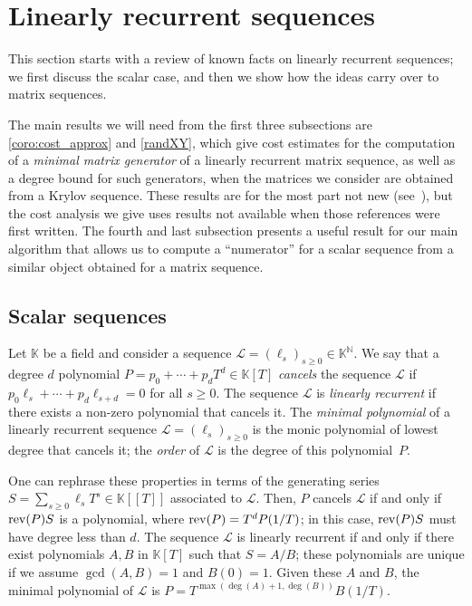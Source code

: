 \documentclass[12pt]{article}
\newcommand{\minpoly}{P}
\def\N {\ensuremath{\mathbb{N}}}
\def\K{\mathbb{K}}
\def\K {\ensuremath{\mathbb{K}}}
\begin{document}

\section{Linearly recurrent sequences}

This section starts with a review of known facts on linearly recurrent
sequences; we first discuss the scalar case, and then we show how the ideas
carry over to matrix sequences. 

The main results we will need from the first three subsections are
\cref{coro:cost_approx} and \cref{randXY}, which give cost estimates
for the computation of a {\em minimal matrix generator} of a linearly
recurrent matrix sequence, as well as a degree bound for such
generators, when the matrices we consider are obtained from a Krylov
sequence. These results are for the most part not new
(see~\cite{Villard97,Villard97a,KalVil01,Turner02}), but the cost
analysis we give uses results not available when those references were
first written.  The fourth and last subsection presents a useful
result for our main algorithm that allows us to compute a
``numerator'' for a scalar sequence from a similar object obtained for
a matrix sequence.


\subsection{Scalar sequences} \label{section:linseq}

Let $\K$ be a field and consider a sequence $\mathcal{L}=(\ell_s)_{s
  \ge 0} \in \K^\N$. We say that a degree $d$ polynomial $\minpoly =
p_0 + \cdots + p_d T^d \in\K[T]$ {\em cancels} the sequence
$\mathcal{L}$ if $p_0 \ell_s + \cdots + p_d \ell_{s+d}=0$ for all $s
\ge 0$. The sequence $\mathcal{L}$ is {\em linearly recurrent} if
there exists a non-zero polynomial that cancels it.  The {\em minimal
  polynomial} of a linearly recurrent sequence
$\mathcal{L}=(\ell_s)_{s \ge 0}$ is the monic polynomial of lowest
degree that cancels it; the {\em order} of $\mathcal{L}$ is the degree
of this polynomial~$\minpoly$.

One can rephrase these properties in terms of the generating series $S=\sum_{s
\ge 0} \ell_s T^s \in \K[[T]]$ associated to $\mathcal{L}$.  Then, $\minpoly$
cancels $\mathcal{L}$ if and only if ${\rm rev}(\minpoly) S$ is a polynomial,
where ${\rm rev}(\minpoly)=T^d \minpoly(1/T)$; in this case, ${\rm
rev}(\minpoly) S$ must have degree less than $d$.  The sequence $\mathcal{L}$
is linearly recurrent if and only if there exist polynomials $A,B$ in $\K[T]$
such that $S=A/B$; these polynomials are unique if we assume $\gcd(A,B)=1$ and
$B(0)=1$.  Given these $A$ and $B$, the minimal polynomial of $\mathcal{L}$ is
$\minpoly = T^{\max(\deg(A)+1,\deg(B))}B(1/T)$. 
\end{document}
